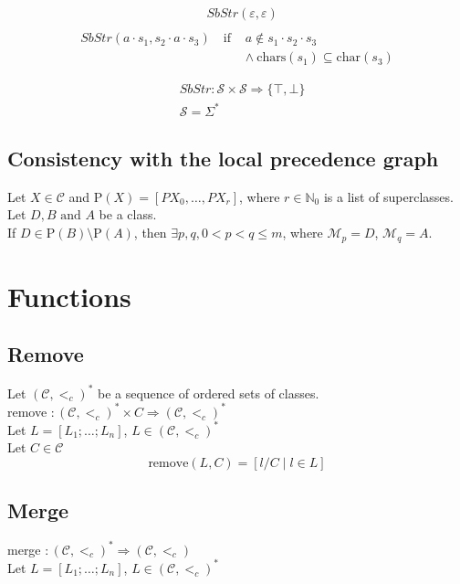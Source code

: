 \documentclass{article}
\begin{document}
\begin{align*}
& SbStr(\varepsilon, \varepsilon) \\
\end{align*}
\begin{align*}
    SbStr(a \cdot s_1, s_2 \cdot a \cdot s_3) \quad \text{if } &
    a \notin s_1 \cdot s_2 \cdot s_3 \\
    & \land \ \text{chars}(s_1) \subseteq \text{char}(s_3)
\end{align*}
    
\begin{align*}
& SbStr : \mathcal{S} \times \mathcal{S} \Rightarrow \{\top, \bot\} \\
& \mathcal{S} = \Sigma^*
\end{align*}

\vspace{2cm}
\subsection*{Consistency with the local precedence graph}

Let $X\in\mathcal{C}$ and $\text{P}(X) = [PX_0, \dots, PX_r]$, where $r \in \mathbb{N}_0$ is a list of superclasses. \\
Let $D, B \text{ and } A$ be a class. \\
If $D \in \text{P}(B) \setminus \text{P}(A)$, then $\exists p,q ,0 < p < q \leq m$, where $\mathcal{M}_p = D$, $\mathcal{M}_q = A$.
\vspace{2cm}

\section*{Functions}
\subsection*{Remove}
Let $(\mathcal{C},<_c)^*$ be a sequence of ordered sets of classes.\\
remove $: (\mathcal{C},<_c)^* \times C \Rightarrow (\mathcal{C},<_c)^*$\\
Let $L = [L_1; \ldots ; L_n]$, $L \in (\mathcal{C},<_c)^*$\\
Let $C \in \mathcal{C}$\\

\[
\text{remove}(L, C) = [l/C \mid l \in L]
\]

\vspace{2cm}
\subsection*{Merge}
merge $: (\mathcal{C},<_c)^* \Rightarrow (\mathcal{C},<_c) $ \\
Let $L = [L_1; \ldots ; L_n]$, $L \in (\mathcal{C},<_c)^*$\\
\end{document}
